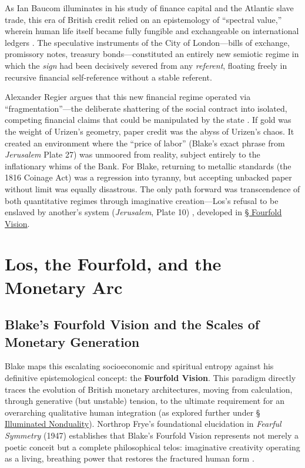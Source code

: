 \documentclass[
]{article}
\begin{document}
As Ian Baucom illuminates in his study of finance capital and the
Atlantic slave trade, this era of British credit relied on an
epistemology of ``spectral value,'' wherein human life itself became
fully fungible and exchangeable on international ledgers
\citep{baucom2005specters}. The speculative instruments of the City of
London---bills of exchange, promissory notes, treasury
bonds---constituted an entirely new semiotic regime in which the
\emph{sign} had been decisively severed from any \emph{referent},
floating freely in recursive financial self-reference without a stable
referent.

Alexander Regier argues that this new financial regime operated via
``fragmentation''---the deliberate shattering of the social contract
into isolated, competing financial claims that could be manipulated by
the state \citep{regier2010fragmentation}. If gold was the weight of
Urizen's geometry, paper credit was the abyss of Urizen's chaos. It
created an environment where the ``price of labor'' (Blake's exact
phrase from \emph{Jerusalem} Plate 27) was unmoored from reality,
subject entirely to the inflationary whims of the Bank. For Blake,
returning to metallic standards (the 1816 Coinage Act) was a regression
into tyranny, but accepting unbacked paper without limit was equally
disastrous. The only path forward was transcendence of both quantitative
regimes through imaginative creation---Los's refusal to be enslaved by
another's system (\emph{Jerusalem}, Plate 10)
\citep{erdman1988complete}, developed in
\hyperref[sec-four-levels-vision]{§ Fourfold Vision}.

\newpage

\section{Los, the Fourfold, and the Monetary
Arc}\label{los-the-fourfold-and-the-monetary-arc}

\subsection{Blake's Fourfold Vision and the Scales of Monetary
Generation}\label{sec-four-levels-vision}

Blake maps this escalating socioeconomic and spiritual entropy against
his definitive epistemological concept: the \textbf{Fourfold Vision}.
This paradigm directly traces the evolution of British monetary
architectures, moving from calculation, through generative (but
unstable) tension, to the ultimate requirement for an overarching
qualitative human integration (as explored further under
\hyperref[sec-illuminated-nonduality]{§ Illuminated Nonduality}).
Northrop Frye's foundational elucidation in \emph{Fearful Symmetry}
(1947) establishes that Blake's Fourfold Vision represents not merely a
poetic conceit but a complete philosophical telos: imaginative
creativity operating as a living, breathing power that restores the
fractured human form \citep{frye1947fearful}.
\end{document}
